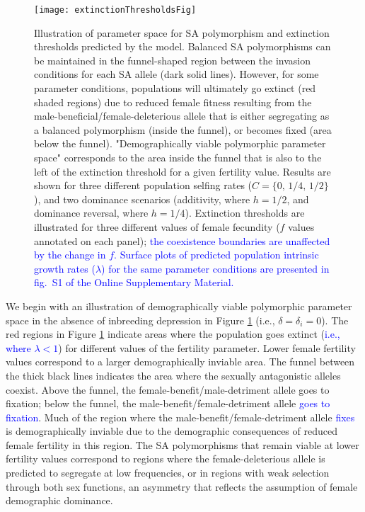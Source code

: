 \documentclass[11pt]{article}
\begin{document}
 \begin{figure}[htbp]
 \centering
 \texttt{[image: extinctionThresholdsFig]}
 \caption{\footnotesize{Illustration of parameter space for SA polymorphism and extinction thresholds predicted by the model. Balanced SA polymorphisms can be maintained in the funnel-shaped region between the invasion conditions for each SA allele (dark solid lines). However, for some parameter conditions, populations will ultimately go extinct (red shaded regions) due to reduced female fitness resulting from the male-beneficial/female-deleterious allele that is either segregating as a balanced polymorphism (inside the funnel), or becomes fixed (area below the funnel). "Demographically viable polymorphic parameter space" corresponds to the area inside the funnel that is also to the left of the extinction threshold for a given fertility value. Results are shown for three different population selfing rates ($C = \{0,\,1/4,\,1/2\}$), and two dominance scenarios (additivity, where $h = 1/2$, and dominance reversal, where $h = 1/4$). Extinction thresholds are illustrated for three different values of female fecundity ($f$ values annotated on each panel); \textcolor{blue}{ the coexistence boundaries are unaffected by the change in $f$.} \textcolor{blue}{Surface plots of predicted population intrinsic growth rates ($\lambda$) for the same parameter conditions are presented in fig.~S1 of the Online Supplementary Material.}}}
 \label{fig:extThresholds}
 \end{figure}

We begin with an illustration of demographically viable polymorphic parameter space in the absence of inbreeding depression in Figure \ref{fig:extThresholds} (i.e., $\delta = \delta_i = 0$). The red regions in Figure \ref{fig:extThresholds} indicate areas where the population goes extinct (\textcolor{blue}{i.e., where $\lambda < 1$}) for different values of the fertility parameter. Lower female fertility values correspond to a larger demographically inviable area. The funnel between the thick black lines indicates the area where the sexually antagonistic alleles coexist. Above the funnel, the female-benefit/male-detriment allele goes to fixation; below the funnel, the male-benefit/female-detriment allele \textcolor{blue}{goes to fixation}. Much of the region where the male-benefit/female-detriment allele \textcolor{blue}{fixes} is demographically inviable due to the demographic consequences of reduced female fertility in this region. The SA polymorphisms that remain viable at lower fertility values correspond to regions where the female-deleterious allele is predicted to segregate at low frequencies, or in regions with weak selection through both sex functions, an asymmetry that reflects the assumption of female demographic dominance.
\end{document}
